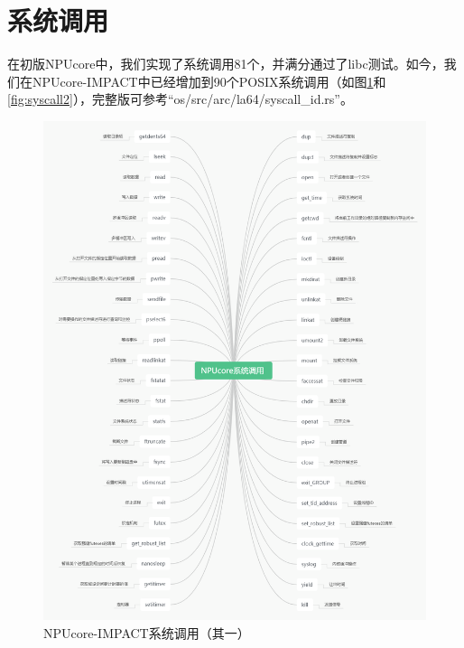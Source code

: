 \section{系统调用}

在初版NPUcore中，我们实现了系统调用81个，并满分通过了libc测试。如今，我们在NPUcore-IMPACT中已经增加到90个POSIX系统调用（如图\ref{fig:syscall1}和\ref{fig:syscall2}），完整版可参考“os/src/arc/la64/syscall_id.rs”。
\begin{figure}[htp]
    \centering
    \includegraphics[width=1\linewidth]{figs/01-03-NPUcore系统调用1.png}
    \caption{NPUcore-IMPACT系统调用（其一）}
    \label{fig:syscall1}
\end{figure}

